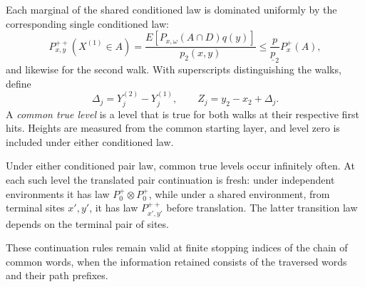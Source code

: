 Each marginal of the shared conditioned law is dominated uniformly by
the corresponding single conditioned law:
\[
P_{x,y}^{++}(X^{(1)}\in A)
 =\frac{E[P_{x,\omega}(A\cap D)q(y)]}{p_2(x,y)}
 \le \frac{p}{\underline p_2}P_x^+(A),
\]
and likewise for the second walk. With superscripts distinguishing the
walks, define
\[
\Delta_j=Y_j^{(2)}-Y_j^{(1)},\qquad
Z_j=y_2-x_2+\Delta_j.
\]
A \emph{common true level} is a level that is true for both walks at their
respective first hits. Heights are measured from the common starting
layer, and level zero is included under either conditioned law.

\begin{lemma}
\label{fluct-common-words}
Under either conditioned pair law, common true levels occur infinitely
often. At each such level the translated pair continuation is fresh:
under independent environments it has law \(P_0^+\otimes P_0^+\), while
under a shared environment, from terminal sites \(x',y'\), it has law
\(P_{x',y'}^{++}\) before translation. The latter transition law depends
on the terminal pair of sites.

These continuation rules remain valid at finite stopping indices of the
chain of common words, when the information retained consists of the
traversed words and their path prefixes.
\end{lemma}

